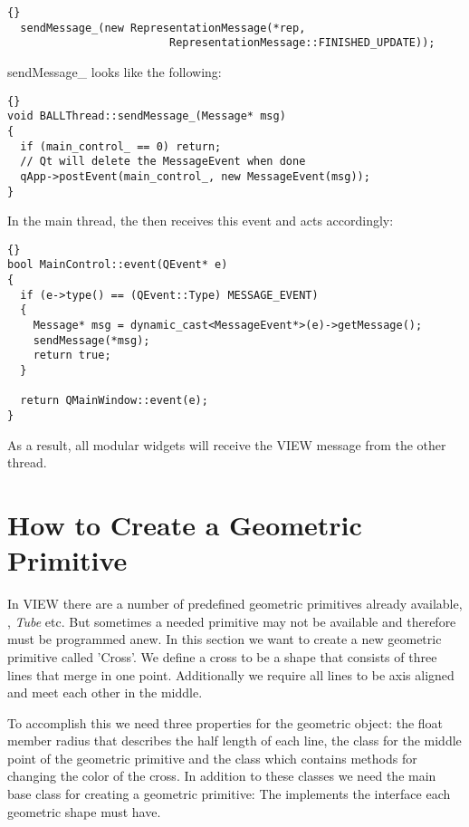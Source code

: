 \begin{lstlisting}{}
  sendMessage_(new RepresentationMessage(*rep,
                         RepresentationMessage::FINISHED_UPDATE));
\end{lstlisting}

\noindent
sendMessage\_ looks like the following:

\begin{lstlisting}{}
void BALLThread::sendMessage_(Message* msg)
{
  if (main_control_ == 0) return;
  // Qt will delete the MessageEvent when done
  qApp->postEvent(main_control_, new MessageEvent(msg));
}
\end{lstlisting}

\noindent
In the main thread, the  then receives this event and acts
accordingly:

\begin{lstlisting}{}
bool MainControl::event(QEvent* e)
{
  if (e->type() == (QEvent::Type) MESSAGE_EVENT)
  {
    Message* msg = dynamic_cast<MessageEvent*>(e)->getMessage();
    sendMessage(*msg);
    return true;
  }

  return QMainWindow::event(e);
}
\end{lstlisting}

\noindent
As a result, all modular widgets will receive the VIEW message from the other
thread.


\section{How to Create a Geometric Primitive}
\label{section:view_create_a_geometric_primitive}

In VIEW there are a number of predefined geometric primitives already 
available, , {\em Tube} etc. But sometimes a needed primitive 
may not be available and therefore must be programmed anew. 
In this section we want to create a new geometric primitive called 'Cross'.
We define a cross to be a shape that consists of three lines that merge in one
point. Additionally we require all lines to be axis aligned and meet each
other in the middle.

To accomplish this we need three properties for the geometric object: the
float member radius that describes the half length of each line, the class 
 for the middle point of the geometric primitive and the class 
 which contains methods for changing the color of the
cross. In addition to these classes we need the main base class for
creating a geometric primitive: The  
implements the interface each geometric shape must have.


